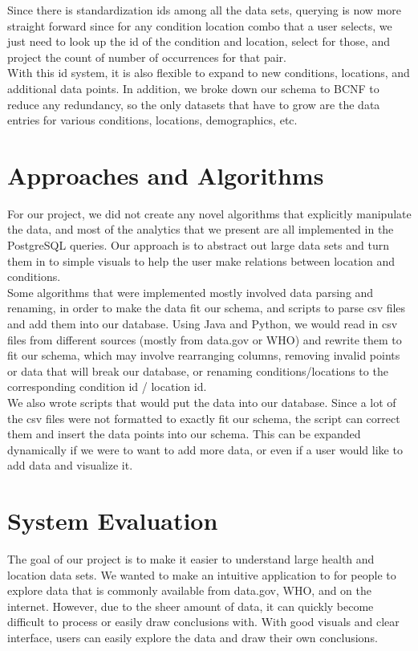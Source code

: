 \documentclass[12pt]{article}
\begin{document}
Since there is standardization ids among all the data sets, querying is now more straight forward since for any condition location combo that a user selects, we just need to look up the id of the condition and location, select for those, and project the count of number of occurrences for that pair.\\

With this id system, it is also flexible to expand to new conditions, locations, and additional data points. In addition, we broke down our schema to BCNF to reduce any redundancy, so the only datasets that have to grow are the data entries for various conditions, locations, demographics, etc. \\
\section{Approaches and Algorithms}
For our project, we did not create any novel algorithms that explicitly manipulate the data, and most of the analytics that we present are all implemented in the PostgreSQL queries. Our approach is to abstract out large data sets and turn them in to simple visuals to help the user make relations between location and conditions.\\

Some algorithms that were implemented mostly involved data parsing and renaming, in order to make the data fit our schema, and scripts to parse csv files and add them into our database. Using Java and Python, we would read in csv files from different sources (mostly from data.gov or WHO) and rewrite them to fit our schema, which may involve rearranging columns, removing invalid points or data that will break our database, or renaming conditions/locations to the corresponding condition id / location id.\\

We also wrote scripts that would put the data into our database. Since a lot of the csv files were not formatted to exactly fit our schema, the script can correct them and insert the data points into our schema. This can be expanded dynamically if we were to want to add more data, or even if a user would like to add data and visualize it.\\
\section{System Evaluation}
The goal of our project is to make it easier to understand large health and location data sets. We wanted to make an intuitive application to for people to explore data that is commonly available from data.gov, WHO, and on the internet. However, due to the sheer amount of data, it can quickly become difficult to process or easily draw conclusions with. With good visuals and clear interface, users can easily explore the data and draw their own conclusions.\\
\end{document}
